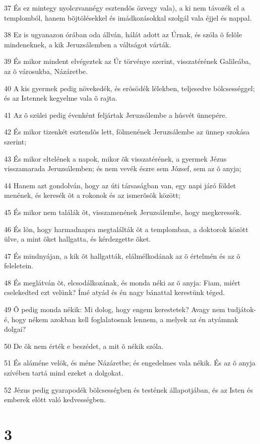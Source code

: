 \par 37 És ez mintegy nyolczvannégy esztendõs özvegy vala), a ki nem távozék el a templomból, hanem bõjtölésekkel és imádkozásokkal szolgál vala éjjel és nappal.
\par 38 Ez is ugyanazon órában oda állván, hálát adott az Úrnak, és szóla õ felõle mindeneknek, a kik Jeruzsálemben a váltságot várták.
\par 39 És mikor mindent elvégeztek az Úr törvénye szerint, visszatérének Galileába, az õ városukba, Názáretbe.
\par 40 A kis gyermek pedig növekedék, és erõsödék lélekben, teljesedve bölcsességgel; és az Istennek kegyelme vala õ rajta.
\par 41 Az õ szülei pedig évenként feljártak Jeruzsálembe a húsvét ünnepére.
\par 42 És mikor tizenkét esztendõs lett, fölmenének Jeruzsálembe az ünnep szokása szerint;
\par 43 És mikor eltelének a napok, mikor õk visszatérének, a gyermek Jézus visszamarada Jeruzsálemben; és nem vevék észre sem József, sem az õ anyja;
\par 44 Hanem azt gondolván, hogy az úti társaságban van, egy napi járó földet menének, és keresék õt a rokonok és az ismerõsök között;
\par 45 És mikor nem találák õt, visszamenének Jeruzsálembe, hogy megkeressék.
\par 46 És lõn, hogy harmadnapra megtalálták õt a templomban, a doktorok között ülve, a mint õket hallgatta, és kérdezgette õket.
\par 47 És mindnyájan, a kik õt hallgatták, elálmélkodának az õ értelmén és az õ feleletein.
\par 48 És meglátván õt, elcsodálkozának, és monda néki az õ anyja: Fiam, miért cselekedted ezt velünk? Ímé atyád és én nagy bánattal kerestünk téged.
\par 49 Õ pedig monda nékik: Mi dolog, hogy engem kerestetek? Avagy nem tudjátok-é, hogy nékem azokban kell foglalatosnak lennem, a melyek az én atyámnak dolgai?
\par 50 De õk nem érték e beszédet, a mit õ nékik szóla.
\par 51 És aláméne velök, és méne Názáretbe; és engedelmes vala nékik. És az õ anyja szívében tartá mind ezeket a dolgokat.
\par 52 Jézus pedig gyarapodék bölcsességben és testének állapotjában, és az Isten és emberek elõtt való kedvességben.

\chapter{3}

